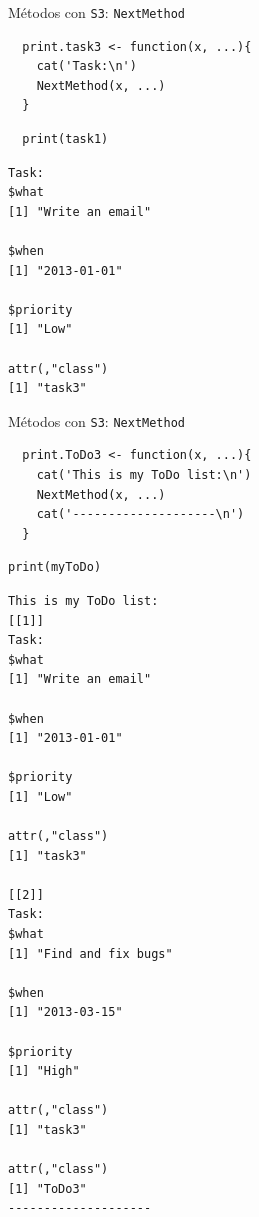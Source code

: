 \documentclass[xcolor={usenames,svgnames,dvipsnames}]{beamer}
\begin{document}
\begin{frame}[fragile,label={sec:orgheadline10}]{Métodos con \texttt{S3}: \texttt{NextMethod}}
 \lstset{language=R,label= ,caption= ,captionpos=b,numbers=none}
\begin{lstlisting}
  print.task3 <- function(x, ...){
    cat('Task:\n')
    NextMethod(x, ...)
  }
\end{lstlisting}

\lstset{language=R,label= ,caption= ,captionpos=b,numbers=none}
\begin{lstlisting}
  print(task1)
\end{lstlisting}

\begin{verbatim}
Task:
$what
[1] "Write an email"

$when
[1] "2013-01-01"

$priority
[1] "Low"

attr(,"class")
[1] "task3"
\end{verbatim}
\end{frame}

\begin{frame}[fragile,label={sec:orgheadline11}]{Métodos con \texttt{S3}: \texttt{NextMethod}}
 \lstset{language=R,label= ,caption= ,captionpos=b,numbers=none}
\begin{lstlisting}
  print.ToDo3 <- function(x, ...){
    cat('This is my ToDo list:\n')
    NextMethod(x, ...)
    cat('--------------------\n')
  }
\end{lstlisting}

\lstset{language=R,label= ,caption= ,captionpos=b,numbers=none}
\begin{lstlisting}
print(myToDo)
\end{lstlisting}

\begin{verbatim}
This is my ToDo list:
[[1]]
Task:
$what
[1] "Write an email"

$when
[1] "2013-01-01"

$priority
[1] "Low"

attr(,"class")
[1] "task3"

[[2]]
Task:
$what
[1] "Find and fix bugs"

$when
[1] "2013-03-15"

$priority
[1] "High"

attr(,"class")
[1] "task3"

attr(,"class")
[1] "ToDo3"
--------------------
\end{verbatim}
\end{frame}
\end{document}

